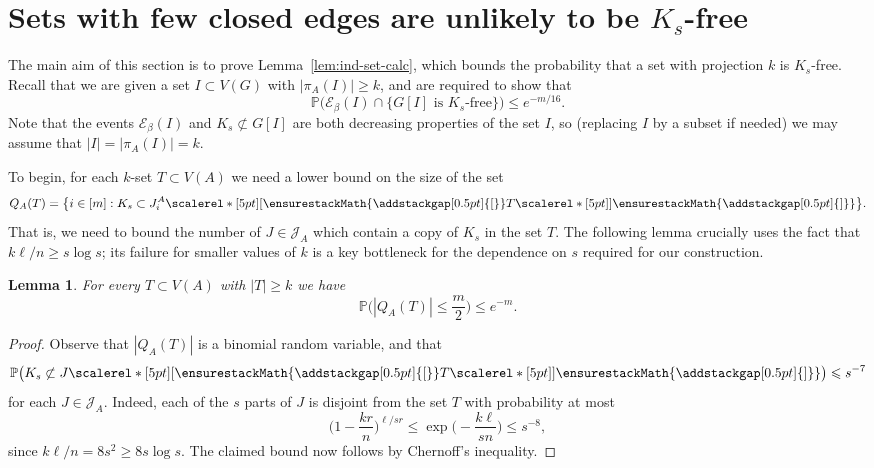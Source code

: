 \documentclass[12pt,reqno]{amsart}
\newcommand\pig[1]{\scalerel*[5pt]{\normalsize#1}{%
  \ensurestackMath{\addstackgap[0.5pt]{\normalsize#1}}}}
\newtheorem{lemma}[theorem]{Lemma}
\theoremstyle{remark}
\numberwithin{theorem}{section}
\renewcommand{\(}{\bigl(}
\renewcommand{\)}{\bigr)\vphantom{)}}
\newcommand{\cE}{\mathcal E}
\newcommand{\cJ}{\mathcal J}
\def\1{\mathbbm{1}}
\renewcommand{\le}{\leqslant}
\renewcommand{\ge}{\geqslant}
\renewcommand{\Pr}{\mathbb{P}}
\begin{document}
\section{Sets with few closed edges are unlikely to be $K_s$-free}\label{sec:prob:bound}

The main aim of this section is to prove Lemma~\ref{lem:ind-set-calc}, which bounds the probability that a set with projection $k$ is $K_s$-free. Recall that we are given a set $I \subset V(G)$ with $|\pi_A(I)| \ge k$, and are required to show that 
$$\Pr\Big( \cE_\beta(I) \cap \big\{ G[I] \text{ is $K_s$-free} \big\} \Big) \le e^{-m/16}.$$
Note that the events $\cE_\beta(I)$ and $K_s \not\subset G[I]$ are both decreasing properties of the set $I$, so (replacing $I$ by a subset if needed) we may assume that $|I| = |\pi_A(I)| = k$. 

To begin, for each $k$-set $T \subset V(A)$ we need a lower bound on the size of the set
$$Q_A(T) = \big\{ i \in [m] :  K_s \subset J^A_i\pig[ T \pig] \big\}.$$
That is, we need to bound the number of $J \in \cJ_A$ which contain a copy of $K_s$ in the set $T$. The following lemma crucially uses the fact that $k \ell / n \ge s \log s$; its failure for smaller values of $k$ is a key bottleneck for the dependence on $s$ required for our construction. 

\begin{lemma}\label{lem:S-hit-I} 
For every $T \subset V(A)$ with $|T| \ge k$ we have 
$$\Pr\bigg( |Q_A(T)| \le \frac{m}{2} \bigg) \le e^{-m}.$$
\end{lemma}

\begin{proof} 
Observe that $|Q_A(T)|$ is a binomial random variable, and that 
$$\Pr\big( K_s \not\subset J\pig[ T \pig] \big) \le s^{-7}$$ 
for each $J \in \cJ_A$. Indeed, each of the $s$ parts of $J$ is disjoint from the set $T$ with probability at most
$$\bigg( 1 - \frac{kr}{n} \bigg)^{\ell/sr} \le \exp\bigg( - \frac{k \ell}{sn} \bigg) \le s^{-8},$$
since $k \ell / n = 8 s^2 \ge 8 s \log s$. The claimed bound now follows by Chernoff's inequality.
\end{proof}


\end{document}
